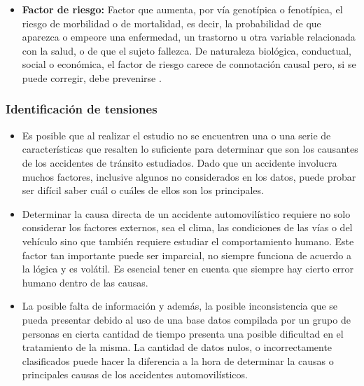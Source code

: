 \documentclass[12pt]{article}
\begin{document}
\begin{itemize}
    \item \textbf{Factor de riesgo:} Factor que aumenta, por vía genotípica o fenotípica, el riesgo de morbilidad o de mortalidad, es decir, la probabilidad de que aparezca o empeore una enfermedad, un trastorno u otra variable relacionada con la salud, o de que el sujeto fallezca. De naturaleza biológica, conductual, social o económica, el factor de riesgo carece de connotación causal pero, si se puede corregir, debe prevenirse \parencite{ranm_factor_riesgo}.
\end{itemize}

\subsubsection{Identificación de tensiones}
\begin{itemize}
    \item Es posible que al realizar el estudio no se encuentren una o una serie de características que resalten lo suficiente para determinar que son los causantes de los accidentes de tránsito estudiados. Dado que un accidente involucra muchos factores, inclusive algunos no considerados en los datos, puede probar ser difícil saber cuál o cuáles de ellos son los principales. 
    
	\item Determinar la causa directa de un accidente automovilístico requiere no solo considerar los factores externos, sea el clima, las condiciones de las vías o del vehículo sino que también requiere estudiar el comportamiento humano. Este factor tan importante puede ser imparcial, no siempre funciona de acuerdo a la lógica y es volátil. Es esencial tener en cuenta que siempre hay cierto error humano dentro de las causas. 
    
	\item La posible falta de información y además, la posible inconsistencia que se pueda presentar debido al uso de una base datos compilada por un grupo de personas en cierta cantidad de tiempo presenta una posible dificultad en el tratamiento de la misma. La cantidad de datos nulos, o incorrectamente clasificados puede hacer la diferencia a la hora de determinar la causas o principales causas de los accidentes automovilísticos. 
\end{itemize}
\end{document}
